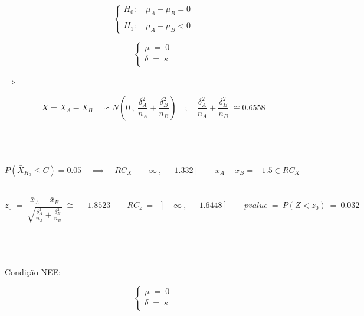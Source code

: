 \begin{minipage}[l]{0pt}
	$$\left\lbrace\begin{array}{l}
		H_0: \quad \mu_A-\mu_B=0 \\
		\\
		H_1: \quad \mu_A-\mu_B<0
	\end{array}\right.$$
\end{minipage}
\begin{minipage}[l]{0pt}
	$$\left\lbrace\begin{array}{c}
		\mu \;=\; 0 \\
		\delta \;=\; s \\
	\end{array}\right.$$
\end{minipage}
\hspace{3cm} $\Longrightarrow$ \hspace{1cm}
\begin{minipage}[l]{0pt}
	\[\bar{X}=\bar{X}_A-\bar{X}_B \quad \backsim N \left( 0\:,\: \frac{\delta_A^2}{n_A}+\frac{\delta_B^2}{n_B} \right) \quad ; \quad \frac{\delta_A^2}{n_A}+\frac{\delta_B^2}{n_B}\;\cong0.6558 \]
\end{minipage}\\
\\
\\
$P(\bar{X}_{H_0} \leqslant C)=0.05 \quad \implies \quad RC_X\left] -\infty \:,\: -1.332 \right] \qquad \bar{x}_A-\bar{x}_B=-1.5 \in RC_X $ \\
\\
\begin{minipage}[l]{0pt}
	\[  z_0\:=\: \frac{\bar{x}_A-\bar{x}_B}{\sqrt{\frac{\delta_A^2}{n_A}+\frac{\delta_B^2}{n_B}}}\:\cong\: -1.8523 \qquad
	RC_z \:=\: \left] -\infty \:,\: -1.6448 \right]  \qquad
	pvalue \:=\: P(Z<z_0) \:=\: 0.032 \]
\end{minipage}\\
\\
\\
\hspace*{5cm} \underline{Condição NEE:}\\
\begin{minipage}[l]{0pt}
	$$\left\lbrace\begin{array}{c}
		\mu \;=\; 0 \\
		\delta \;=\; s \\
	\end{array}\right.$$
\end{minipage}
